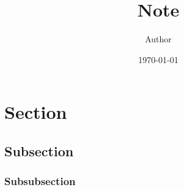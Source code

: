 \documentclass{article}
\title{Note}
\author{Author}
\date{\today}
\begin{document}
\maketitle
\newpage

\tableofcontents
\newpage

\section{Section}
\subsection{Subsection}
\subsubsection{Subsubsection}
\end{document}
